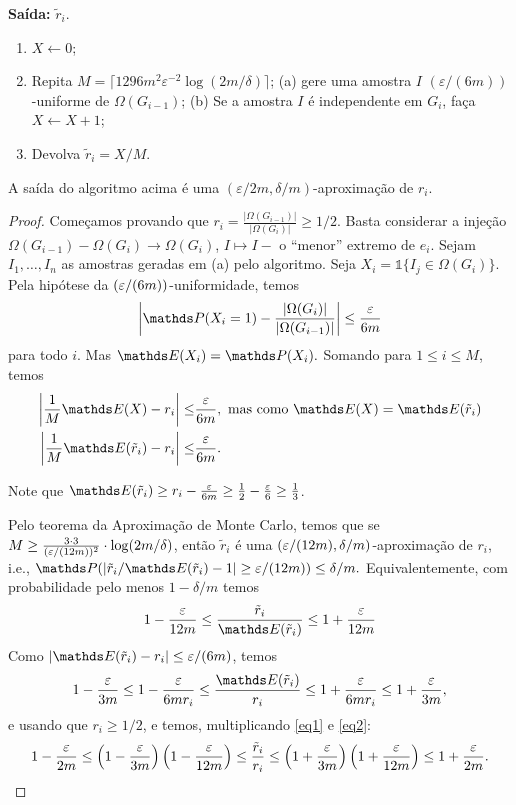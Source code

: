 \textbf{Saída:} $\tilde{r}_i$.
\begin{enumerate}
	\item $X \leftarrow 0$;
	\item Repita $M = \lceil 1296 m^2\varepsilon^{-2}\log (2m/\delta)\rceil$;
	\subitem(a) gere uma amostra $I$ $(\varepsilon/(6m))$-uniforme de $\Omega(G_{i-1})$;
	\subitem(b) Se a amostra $I$ é independente em $G_i$, faça $X \leftarrow X+1$;
	\item Devolva $\tilde{r}_i = X/M$.
\end{enumerate}
\begin{lema}
	A saída do algoritmo acima é uma $(\varepsilon/2m, \delta/m)$-aproximação de $r_i$.
\end{lema}
\begin{proof}
	Começamos provando que 
	$r_i = \frac{|\Omega(G_{i-1})|}{|\Omega(G_i)|} \geq 1/2$. Basta
	considerar a injeção $\Omega(G_{i-1}) - \Omega(G_i) \to\Omega(G_i)$,
	$I\mapsto I - \text{ o ``menor'' extremo de } e_i$.
	Sejam $I_1, \dots, I_n$ as amostras geradas em (a) pelo algoritmo.
	Seja $X_i = \mathds{1}\{I_j \in \Omega(G_i)\}$. Pela hipótese da 
	$(\varepsilon/(6m))$-uniformidade, temos
	$$\left|\PP(X_i = 1) - \frac{|\Omega(G_i)|}{|\Omega(G_{i-1})|} \right| \leq \frac{\eps}{6m}$$
	para todo $i$. Mas $\EE(X_i) = \PP(X_i).$
	Somando para $1 \leq i \leq M$, temos
	\begin{align*}
	\left| \frac{1}{M} \EE(X) - r_i\right|\leq & \frac{\eps}{6m}, 
	\text{ mas como }\EE(X) = \EE(\tilde{r}_i) \\
	\left| \frac{1}{M} \EE(\tilde{r}_i) - r_i\right|\leq & \frac{\eps}{6m}.
	\end{align*}
	
	Note que $\EE(\tilde{r}_i) \geq r_i - \frac{\eps}{6m} \geq \frac{1}{2} - \frac{\eps}{6} \geq \frac{1}{3}$.
	
	Pelo teorema da Aproximação de Monte Carlo, temos que se 
	$M \geq \frac{3\cdot 3}{(\varepsilon/(12m))^2}\cdot \log (2m/\delta)$, 
	então $\tilde{r}_i$ é uma $(\varepsilon/(12m), \delta/m)$-aproximação
	de $r_i$, i.e., $\PP(|\tilde{r}_i/\EE(\tilde{r}_i) - 1| \geq \eps/(12m)) \leq \delta/m.$ Equivalentemente, com probabilidade pelo menos $1 - \delta/m$ temos
	\begin{equation}\label{eq1}
		1 - \frac{\eps}{12m} \leq \frac{\tilde{r}_i}{\EE(\tilde{r}_i)}
		\leq 1 + \frac{\eps}{12m}
	\end{equation}
	Como $|\EE(\tilde{r}_i) - r_i| \leq \eps/(6m)$, temos
	\begin{equation}\label{eq2}
		1 - \frac{\eps}{3m} \leq 1 - \frac{\eps}{6mr_i} \leq
		\frac{\EE(\tilde{r}_i)}{r_i} \leq 1 + \frac{\eps}{6mr_i} \leq
		1 + \frac{\eps}{3m},
	\end{equation}
	e usando que $r_i \geq 1/2$, e temos, multiplicando \ref{eq1} e \ref{eq2}:
	\begin{equation*}
		1 - \frac{\varepsilon}{2m} \leq \left(1 - \frac{\varepsilon}{3m} \right)
		\left(1 - \frac{\varepsilon}{12m}\right) \leq \frac{\tilde{r}_i}{r_i}
		\leq \left(1 + \frac{\varepsilon}{3m}\right)
		\left(1 + \frac{\varepsilon}{12m}\right) \leq 1 + \frac{\varepsilon}{2m}.
	\end{equation*}
\end{proof}

